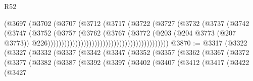 \begin{lexlean}{R52}
\begin{coremodule}
                                                          (@3697
                                                            (@3702
                                                              (@3707
                                                                (@3712
                                                                  (@3717
                                                                    (@3722
                                                                      (@3727
                                                                        (@3732
                                                                          (@3737
                                                                            (@3742
                                                                              (@3747
                                                                                (@3752
                                                                                  (@3757
                                                                                    (@3762
                                                                                      (@3767
                                                                                        (@3772
                                                                                          (@203
                                                                                            (@204
                                                                                              @3773
                                                                                              (@207
                                                                                                @3773))
                                                                                            @226))))))))))))))))))))))))))))))))))))))))))))
@3870 := @3317
    (@3322
      (@3327
        (@3332
          (@3337
            (@3342
              (@3347
                (@3352
                  (@3357
                    (@3362
                      (@3367
                        (@3372
                          (@3377
                            (@3382
                              (@3387
                                (@3392
                                  (@3397
                                    (@3402
                                      (@3407
                                        (@3412
                                          (@3417
                                            (@3422
                                              (@3427

\end{coremodule}
\end{lexlean}
